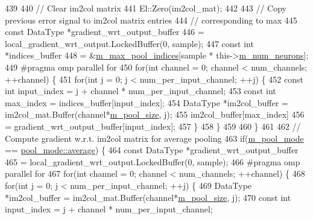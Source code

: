 \begin{DoxyCode}
439 
440         \textcolor{comment}{// Clear im2col matrix}
441         El::Zero(im2col\_mat);
442 
443         \textcolor{comment}{// Copy previous error signal to im2col matrix entries}
444         \textcolor{comment}{// corresponding to max}
445         \textcolor{keyword}{const} DataType *gradient\_wrt\_output\_buffer
446           = local\_gradient\_wrt\_output.LockedBuffer(0, sample);
447         \textcolor{keyword}{const} \textcolor{keywordtype}{int} *indices\_buffer
448           = &\hyperlink{classlbann_1_1pooling__layer_a58683798db4c48175cbad5ec32ff676c}{m\_max\_pool\_indices}[sample * this->\hyperlink{classlbann_1_1Layer_a6b5ebc8a7d9329d8a773ed787e7b41d8}{m\_num\_neurons}];
449 \textcolor{preprocessor}{        #pragma omp parallel for}
450         \textcolor{keywordflow}{for}(\textcolor{keywordtype}{int} channel = 0; channel < num\_channels; ++channel) \{
451           \textcolor{keywordflow}{for}(\textcolor{keywordtype}{int} j = 0; j < num\_per\_input\_channel; ++j) \{
452             \textcolor{keyword}{const} \textcolor{keywordtype}{int} input\_index = j + channel * num\_per\_input\_channel;
453             \textcolor{keyword}{const} \textcolor{keywordtype}{int} max\_index = indices\_buffer[input\_index];
454             DataType *im2col\_buffer = im2col\_mat.Buffer(channel*\hyperlink{classlbann_1_1pooling__layer_a8b3a9020bb896a1132c9823bc2c73515}{m\_pool\_size}, j);
455             im2col\_buffer[max\_index]
456               = gradient\_wrt\_output\_buffer[input\_index];
457           \}
458         \}
459 
460       \}
461 
462       \textcolor{comment}{// Compute gradient w.r.t. im2col matrix for average pooling}
463       \textcolor{keywordflow}{if}(\hyperlink{classlbann_1_1pooling__layer_a7b19407c88f89757e64ed3d4afab8443}{m\_pool\_mode} == \hyperlink{base_8hpp_ac47a6ee5278a53898222a48639a2bf39a6927a3a7218a3195858411433ec20a21}{pool\_mode::average}) \{
464         \textcolor{keyword}{const} DataType *gradient\_wrt\_output\_buffer
465           = local\_gradient\_wrt\_output.LockedBuffer(0, sample);
466 \textcolor{preprocessor}{        #pragma omp parallel for}
467         \textcolor{keywordflow}{for}(\textcolor{keywordtype}{int} channel = 0; channel < num\_channels; ++channel) \{
468           \textcolor{keywordflow}{for}(\textcolor{keywordtype}{int} j = 0; j < num\_per\_input\_channel; ++j) \{
469             DataType *im2col\_buffer = im2col\_mat.Buffer(channel*\hyperlink{classlbann_1_1pooling__layer_a8b3a9020bb896a1132c9823bc2c73515}{m\_pool\_size}, j);
470             \textcolor{keyword}{const} \textcolor{keywordtype}{int} input\_index = j + channel * num\_per\_input\_channel;

\end{DoxyCode}
